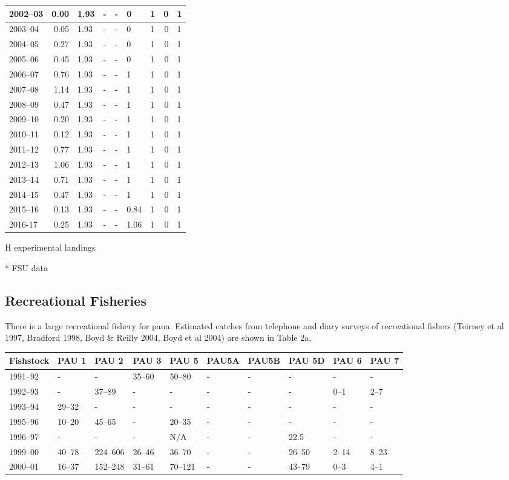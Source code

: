 \documentclass{mpi-plenary}
\theoremstyle{definition}
\theoremstyle{definition}
\theoremstyle{definition}
\theoremstyle{remark}
\begin{document}
\begin{tabular}{l|r|l|l|l|l|l|r|l}
\hline
2002–03 & 0.00 & 1.93 & - & - & 0 & 1 & 0 & 1\\
\hline
2003–04 & 0.05 & 1.93 & - & - & 0 & 1 & 0 & 1\\
\hline
2004–05 & 0.27 & 1.93 & - & - & 0 & 1 & 0 & 1\\
\hline
2005–06 & 0.45 & 1.93 & - & - & 0 & 1 & 0 & 1\\
\hline
2006–07 & 0.76 & 1.93 & - & - & 1 & 1 & 0 & 1\\
\hline
2007–08 & 1.14 & 1.93 & - & - & 1 & 1 & 0 & 1\\
\hline
2008–09 & 0.47 & 1.93 & - & - & 1 & 1 & 0 & 1\\
\hline
2009–10 & 0.20 & 1.93 & - & - & 1 & 1 & 0 & 1\\
\hline
2010–11 & 0.12 & 1.93 & - & - & 1 & 1 & 0 & 1\\
\hline
2011–12 & 0.77 & 1.93 & - & - & 1 & 1 & 0 & 1\\
\hline
2012–13 & 1.06 & 1.93 & - & - & 1 & 1 & 0 & 1\\
\hline
2013–14 & 0.71 & 1.93 & - & - & 1 & 1 & 0 & 1\\
\hline
2014–15 & 0.47 & 1.93 & - & - & 1 & 1 & 0 & 1\\
\hline
2015–16 & 0.13 & 1.93 & - & - & 0.84 & 1 & 0 & 1\\
\hline
2016-17 & 0.25 & 1.93 & - & - & 1.06 & 1 & 0 & 1\\
\hline
\end{tabular}

H experimental landings

* FSU data

\subsection{Recreational Fisheries}\label{recreational-fisheries}

There is a large recreational fishery for paua. Estimated catches from
telephone and diary surveys of recreational fishers (Teirney et al 1997,
Bradford 1998, Boyd \& Reilly 2004, Boyd et al 2004) are shown in Table
2a.

\begin{tabular}{l|l|l|l|l|l|l|l|l|l}
\hline
Fishstock & PAU 1 & PAU 2 & PAU 3 & PAU 5 & PAU5A & PAU5B & PAU 5D & PAU 6 & PAU 7\\
\hline
1991–92 & - & - & 35–60 & 50–80 & - & - & - & - & -\\
\hline
1992–93 & - & 37–89 & - & - & - & - & - & 0–1 & 2–7\\
\hline
1993–94 & 29–32 & - & - & - & - & - & - & - & -\\
\hline
1995–96 & 10–20 & 45–65 & - & 20–35 & - & - & - & - & -\\
\hline
1996–97 & - & - & - & N/A & - & - & 22.5 & - & -\\
\hline
1999–00 & 40–78 & 224–606 & 26–46 & 36–70 & - & - & 26–50 & 2–14 & 8–23\\
\hline
2000–01 & 16–37 & 152–248 & 31–61 & 70–121 & - & - & 43–79 & 0–3 & 4–1\\
\hline
\end{tabular}
\end{document}
